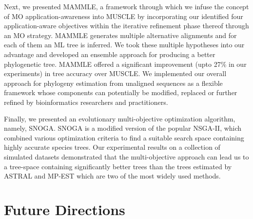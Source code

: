 Next, we presented MAMMLE, a framework through which we infuse the concept of MO application-awareness into MUSCLE by incorporating our identified four application-aware objectives within the iterative refinement phase thereof through an MO strategy. MAMMLE generates multiple alternative alignments and for each of them an ML tree is inferred. We took these multiple hypotheses into our advantage and developed an ensemble approach for producing a better phylogenetic tree. MAMMLE offered a significant improvement (upto 27\% in our experiments) in tree accuracy over MUSCLE. We implemented our overall approach for phylogeny estimation from unaligned sequences as a flexible framework whose components can potentially be modified, replaced or further refined by bioinformatics researchers and practitioners.

Finally, we presented an evolutionary multi-objective optimization algorithm, namely, SNOGA. SNOGA is a modified version of the popular NSGA-II, which combined various optimization criteria to find a suitable search space containing highly accurate species trees. Our experimental results on a collection of simulated datasets demonstrated that the multi-objective approach can lead us to a tree-space containing significantly better trees than the trees estimated by ASTRAL and MP-EST which are two of the most widely used methods. 

\section{Future Directions}

